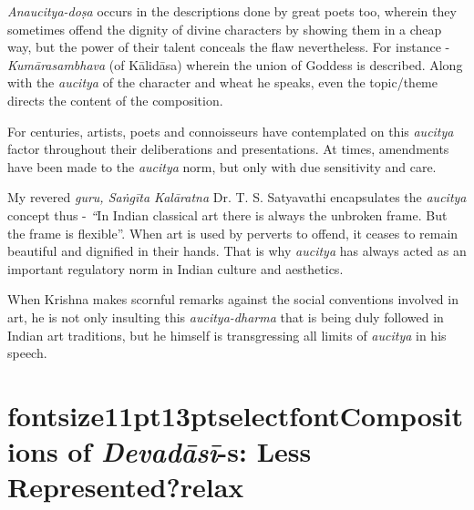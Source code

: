 {\textit{Anaucitya-doṣa} occurs in the descriptions done by great poets too, wherein they sometimes offend the dignity of divine characters by showing them in a cheap way, but the power of their talent conceals the flaw nevertheless. For instance - \textit{Kumārasambhava} (of Kālidāsa) wherein the union of Goddess is described.} Along with the \textit{aucitya} of the character and wheat he speaks, even the topic/theme directs the content of the composition.

For centuries, artists, poets and connoisseurs have contemplated on this \textit{aucitya} factor throughout their deliberations and presentations. At times, amendments have been made to the \textit{aucitya} norm, but only with due sensitivity and care.

My revered \textit{guru, Saṅgīta Kalāratna} Dr. T. S. Satyavathi encapsulates the \textit{aucitya} concept thus - \textit{“}In Indian classical art there is always the unbroken frame. But the frame is flexible”. When art is used by perverts to offend, it ceases to remain beautiful and dignified in their hands. That is why \textit{aucitya} has always acted as an important regulatory norm in Indian culture and aesthetics.

When Krishna makes scornful remarks against the social conventions involved in art, he is not only insulting this \textit{aucitya-dharma} that is being duly followed in Indian art traditions, but he himself is transgressing all limits of \textit{aucitya} in his speech.

\vspace{-.3cm}

\section*{fontsize{11pt}{13pt}selectfontCompositions of \textit{Devadāsī}-s: Less Represented?relax}

